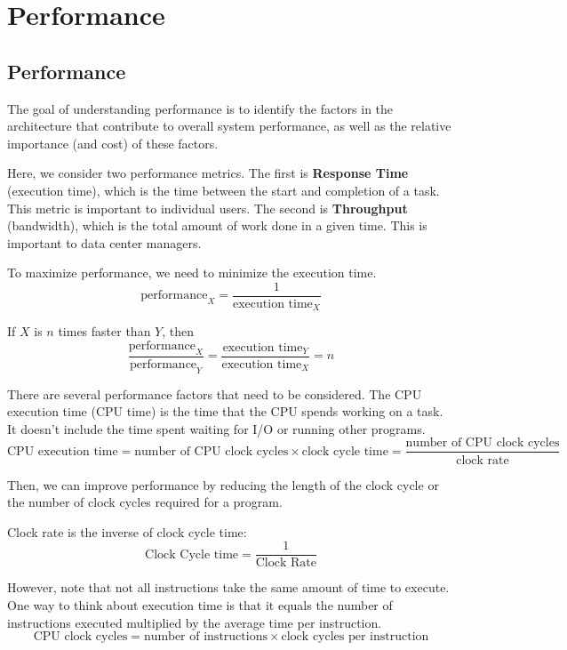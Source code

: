 \chapter{Performance}

\section{Performance}
The goal of understanding performance is to identify the factors in the architecture that contribute to overall system performance, as well as the relative importance (and cost) of these factors.

Here, we consider two performance metrics. The first is \textbf{Response Time} (execution time), which is the time between the start and completion of a task. This metric is important to individual users. The second is \textbf{Throughput} (bandwidth), which is the total amount of work done in a given time. This is important to data center managers.

To maximize performance, we need to minimize the execution time.
\[
  \text{performance}_X = \dfrac{1}{\text{execution time}_X}
\]

If \(X\) is \(n\) times faster than \(Y\), then
\[
  \dfrac{\text{performance}_X}{\text{performance}_Y} = \dfrac{\text{execution time}_Y}{\text{execution time}_X} = n
\]

There are several performance factors that need to be considered. The CPU execution time (CPU time) is the time that the CPU spends working on a task. It doesn't include the time spent waiting for I/O or running other programs.
\[
  \text{CPU execution time} = \text{number of CPU clock cycles} \times \text{clock cycle time} = \dfrac{\text{number of CPU clock cycles}}{\text{clock rate}}
\]

Then, we can improve performance by reducing the length of the clock cycle or the number of clock cycles required for a program.

\begin{remark}
  Clock rate is the inverse of clock cycle time: 
  \[
    \text{Clock Cycle time} = \dfrac{1}{\text{Clock Rate}}
  \]
\end{remark}

However, note that not all instructions take the same amount of time to execute. One way to think about execution time is that it equals the number of instructions executed multiplied by the average time per instruction.
\[
  \text{CPU clock cycles} = \text{number of instructions} \times \text{clock cycles per instruction}
\]

